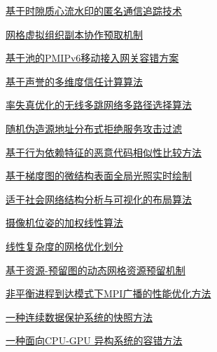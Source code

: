 \documentclass[a4paper]{article}
\begin{document}
\href{http://www.jos.org.cn/ch/reader/download_pdf.aspx?file_no=3929&year_id=2011&quarter_id=10&falg=1}{基于时隙质心流水印的匿名通信追踪技术}

\href{http://www.jos.org.cn/ch/reader/download_pdf.aspx?file_no=3925&year_id=2011&quarter_id=10&falg=1}{网格虚拟组织副本协作预取机制}

\href{http://www.jos.org.cn/ch/reader/download_pdf.aspx?file_no=3905&year_id=2011&quarter_id=10&falg=1}{基于池的PMIPv6移动接入网关容错方案}

\href{http://www.jos.org.cn/ch/reader/download_pdf.aspx?file_no=3909&year_id=2011&quarter_id=10&falg=1}{基于声誉的多维度信任计算算法}

\href{http://www.jos.org.cn/ch/reader/download_pdf.aspx?file_no=3884&year_id=2011&quarter_id=10&falg=1}{率失真优化的无线多跳网络多路径选择算法}

\href{http://www.jos.org.cn/ch/reader/download_pdf.aspx?file_no=3882&year_id=2011&quarter_id=10&falg=1}{随机伪造源地址分布式拒绝服务攻击过滤}

\href{http://www.jos.org.cn/ch/reader/download_pdf.aspx?file_no=3888&year_id=2011&quarter_id=10&falg=1}{基于行为依赖特征的恶意代码相似性比较方法}

\href{http://www.jos.org.cn/ch/reader/download_pdf.aspx?file_no=3881&year_id=2011&quarter_id=10&falg=1}{基于梯度图的微结构表面全局光照实时绘制}

\href{http://www.jos.org.cn/ch/reader/download_pdf.aspx?file_no=3896&year_id=2011&quarter_id=10&falg=1}{适于社会网络结构分析与可视化的布局算法}

\href{http://www.jos.org.cn/ch/reader/download_pdf.aspx?file_no=3916&year_id=2011&quarter_id=10&falg=1}{摄像机位姿的加权线性算法}

\href{http://www.jos.org.cn/ch/reader/download_pdf.aspx?file_no=3927&year_id=2011&quarter_id=10&falg=1}{线性复杂度的网格优化划分}

\href{http://www.jos.org.cn/ch/reader/download_pdf.aspx?file_no=3912&year_id=2011&quarter_id=10&falg=1}{基于资源-预留图的动态网格资源预留机制}

\href{http://www.jos.org.cn/ch/reader/download_pdf.aspx?file_no=3915&year_id=2011&quarter_id=10&falg=1}{非平衡进程到达模式下MPI广播的性能优化方法}

\href{http://www.jos.org.cn/ch/reader/download_pdf.aspx?file_no=4048&year_id=2011&quarter_id=10&falg=1}{一种连续数据保护系统的快照方法}

\href{http://www.jos.org.cn/ch/reader/download_pdf.aspx?file_no=4058&year_id=2011&quarter_id=10&falg=1}{一种面向CPU-GPU 异构系统的容错方法}
\end{document}
